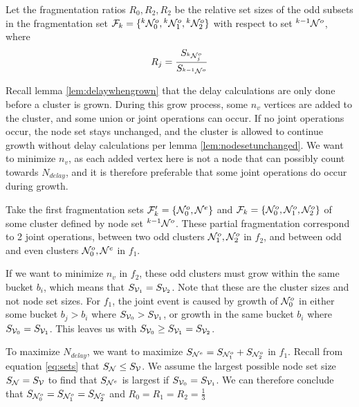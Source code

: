 \begin{lemma}\label{lem:fragratio}
  Let the fragmentation ratios $R_0, R_2, R_2$ be the relative set sizes of the odd subsets in the fragmentation set $\mathcal{F}_{k} = \{{}^{k}\mathcal{N}^o_0, {}^{k}\mathcal{N}^{o}_1, {}^{k}\mathcal{N}^{o}_2 \}$ with respect to set ${}^{k-1}\mathcal{N}^o$, where
  \begin{equation}\label{eq:fragratio}
    R_j = \frac{S_{{}^{k}\mathcal{N}^o_j}}{S_{{}^{k-1}\mathcal{N}^o}}
  \end{equation}
\end{lemma}

Recall lemma \ref{lem:delaywhengrown} that the delay calculations are only done before a cluster is grown. During this grow process, some $n_v$ vertices are added to the cluster, and some union or joint operations can occur. If no joint operations occur, the node set stays unchanged, and the cluster is allowed to continue growth without delay calculations per lemma \ref{lem:nodesetunchanged}. We want to minimize $n_v$, as each added vertex here is not a node that can possibly count towards $N_{delay}$, and it is therefore preferable that some joint operations do occur during growth.

Take the first fragmentation sets $\mathcal{F}'_{k} = \{\mathcal{N}^o_0, \mathcal{N}^{e} \}$ and $\mathcal{F}_{k} = \{\mathcal{N}^o_0, \mathcal{N}^{o}_1, \mathcal{N}^{o}_2 \}$ of some cluster defined by node set ${}^{k-1}\mathcal{N}^o$. These partial fragmentation correspond to 2 joint operations, between two odd clusters $ \mathcal{N}^{o}_1, \mathcal{N}^{o}_2 $ in $f_2$, and between odd and even clusters $\mathcal{N}^o_0, \mathcal{N}^{e} $ in $f_1$.

If we want to minimize $n_v$ in $f_2$, these odd clusters must grow within the same bucket $b_i$, which means that $S_{\mathcal{V}_1} = S_{\mathcal{V}_2}$. Note that these are the cluster sizes and not node set sizes. For $f_1$, the joint event is caused by growth of $\mathcal{N}^o_0$ in either some bucket $b_j > b_i$ where $ S_{\mathcal{V}_0} > S_{\mathcal{V}_1} $, or growth in the same bucket $b_i$ where $S_{\mathcal{V}_0} = S_{\mathcal{V}_1} $. This leaves us with $S_{\mathcal{V}_0} \geq S_{\mathcal{V}_1} = S_{\mathcal{V}_2}$.

To maximize $N_{delay}$, we want to maximize $S_{\mathcal{N}^e} = S_{\mathcal{N}^o_1} + S_{\mathcal{N}^o_2}$ in $f_1$. Recall from equation \ref{eq:sets} that $S_{\mathcal{N}} \leq S_{\mathcal{V}}$. We assume the largest possible node set size $S_{\mathcal{N}} = S_{\mathcal{V}}$ to find that $ S_{\mathcal{N}^e} $ is largest if $S_{\mathcal{V}_0} = S_{\mathcal{V}_1}$. We can therefore conclude that $S_{\mathcal{N}^o_0} = S_{\mathcal{N}^o_1} = S_{\mathcal{N}^o_2}$ and $R_0 = R_1 = R_2 = \frac{1}{3}$

